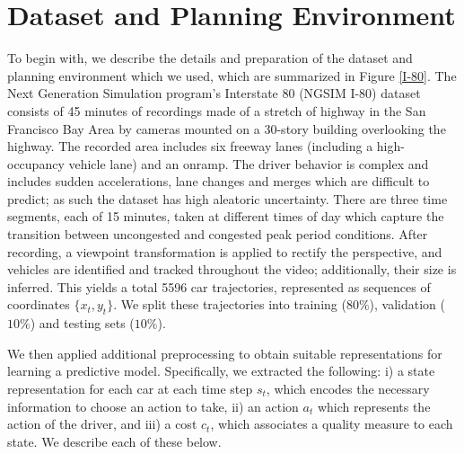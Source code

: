 \documentclass{article} %
\begin{document}
\appendix

\section{Dataset and Planning Environment}
\label{i80-dataset-prep}

To begin with, we describe the details and preparation of the dataset and planning environment which we used, which are summarized in Figure \ref{I-80}.
The Next Generation Simulation program's Interstate 80 (NGSIM I-80) dataset \citep{NGSIM} consists of 45 minutes of recordings made of a stretch of highway in the San Francisco Bay Area by cameras mounted on a 30-story building overlooking the highway. The recorded area includes six freeway lanes (including a high-occupancy vehicle lane) and an onramp.
The driver behavior is complex and includes sudden accelerations, lane changes and merges which are difficult to predict; as such the dataset has high aleatoric uncertainty.
There are three time segments, each of 15 minutes, taken at different times of day which capture the transition between uncongested and congested peak period conditions.
After recording, a viewpoint transformation is applied to rectify the perspective, and vehicles are identified and tracked throughout the video; additionally, their size is inferred.
This yields a total 5596 car trajectories, represented as sequences of coordinates $\{x_t, y_t\}$. We split these trajectories into training ($80\%$), validation ($10\%$) and testing sets ($10\%$).

We then applied additional preprocessing to obtain suitable representations for learning a predictive model.
Specifically, we extracted the following: i) a state representation for each car at each time step $s_t$, which encodes the necessary information to choose an action to take, ii) an action $a_t$ which represents the action of the driver, and iii) a cost $c_t$, which associates a quality measure to each state. We describe each of these below.
\end{document}

